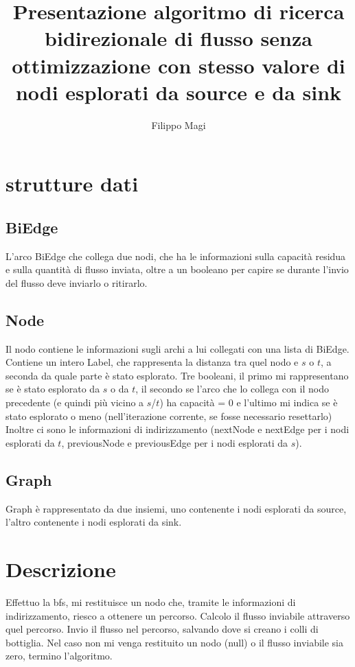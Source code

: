 \documentclass{article}
\title{Presentazione algoritmo di ricerca bidirezionale di flusso senza ottimizzazione con stesso valore di nodi esplorati da source e da sink}
\author{Filippo Magi }
\begin{document}
\maketitle

\section{strutture dati}

\subsection{BiEdge}

L'arco BiEdge che collega due nodi, che ha le informazioni sulla capacità residua e sulla quantità di flusso inviata, oltre a un booleano per capire se durante l'invio del flusso deve inviarlo o ritirarlo.

\subsection{Node}

Il nodo contiene le informazioni sugli archi a lui collegati con una lista di BiEdge.
Contiene un intero Label, che rappresenta la distanza tra quel nodo e $s$ o $t$, a seconda da quale parte è stato esplorato.
Tre booleani, il primo mi rappresentano se è stato esplorato da $s$ o da $t$, il secondo se l'arco che lo collega con il nodo precedente (e quindi più vicino a $s$/$t$) ha capacità =  0 e l'ultimo mi indica se è stato esplorato o meno (nell'iterazione corrente, se fosse necessario resettarlo)
Inoltre ci sono le informazioni di indirizzamento (nextNode e nextEdge per i nodi esplorati da $t$, previousNode e previousEdge per i nodi esplorati da $s$).

\subsection{Graph}
Graph è rappresentato da due insiemi, uno contenente i nodi esplorati da source, l'altro contenente i nodi esplorati da sink.

\section{Descrizione}

Effettuo la bfs, mi restituisce un nodo che, tramite le informazioni
di indirizzamento, riesco a ottenere un percorso.
Calcolo il flusso inviabile attraverso quel percorso.
Invio il flusso nel percorso, salvando dove si creano i colli di bottiglia.
Nel caso non mi venga restituito un nodo (null) o il flusso inviabile sia zero, termino l'algoritmo.
\end{document}
